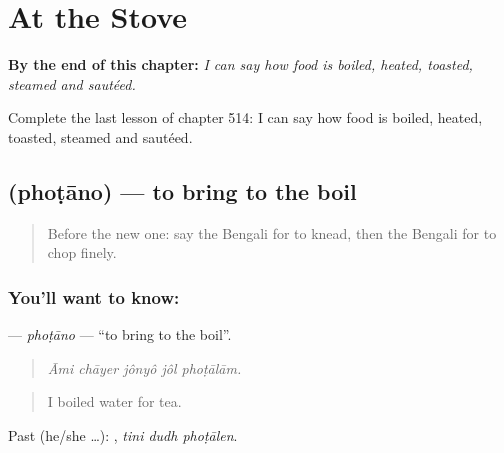 
\chapter{At the Stove}
\label{ch:bn-at-the-stove}

\begin{chapteropening}
\textbf{By the end of this chapter:} \emph{I can say how food is boiled, heated, toasted, steamed and sautéed.}

Complete the last lesson of chapter 514: I can say how food is boiled, heated, toasted, steamed and sautéed.
\end{chapteropening}

\section[\texorpdfstring{\bn{ফোটানো} (phoṭāno)}{ফোটানো (phoṭāno)}]{ (phoṭāno) — to bring to the boil}

\label{lesson:BN-C514-photano}



\begin{quote}
Before the new one: say the Bengali for to knead, then the Bengali for to chop finely.
\end{quote}

\subsection*{You'll want to know: }
\textbf{} — \emph{phoṭāno} — \textquotedblleft{}to bring to the boil\textquotedblright{}.

\begin{quote}
    
\end{quote}

\begin{quote}
\emph{Āmi chāyer jônyô jôl phoṭālām.}
\end{quote}

\begin{quote}
I boiled water for tea.
\end{quote}

Past (he/she …):   , \emph{tini dudh phoṭālen}.

